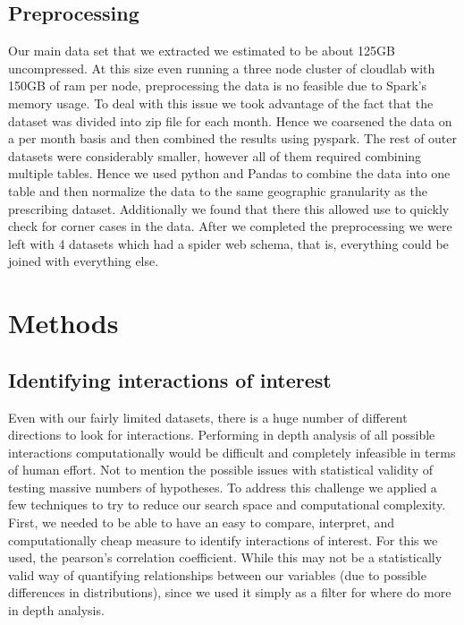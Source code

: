 \documentclass[a4paper]{article}
\begin{document}

	\subsection{Preprocessing}
		Our main data set that we extracted we estimated to be about 125GB uncompressed. At this size
		even running a three node cluster of cloudlab with 150GB of ram per node, preprocessing the 
		data is no feasible due to Spark's memory usage. To deal with this issue we took advantage 
		of the fact that the dataset was divided into zip file for each month. Hence we coarsened the
		data on a per month basis and then combined the results using pyspark. The rest of outer datasets
		were considerably smaller, however all of them required combining multiple tables. Hence 
		we used python and Pandas to combine the data into one table and then normalize the data to the same geographic 
		granularity as the prescribing dataset. Additionally we found that there this allowed use to quickly check for 
		corner cases in the data. After we completed the preprocessing we were left with 4 datasets which had a 
		spider web schema, that is, everything could be joined with everything else. %



\section{Methods}
	
	\subsection{Identifying interactions of interest}


		Even with our fairly limited datasets, there is a huge number of different directions to 
		look for interactions. Performing in depth analysis of all possible interactions computationally 
		would be difficult and completely infeasible in terms of human effort. Not to mention the possible 
		issues with statistical validity of testing massive numbers of hypotheses. To address this challenge
		we applied a few techniques to try to reduce our search space and computational complexity. First,
		we needed to be able to have an easy to compare, interpret, and computationally cheap measure
		to identify interactions of interest. For this we used, the pearson's correlation coefficient. While
		this may not be a statistically valid way of quantifying relationships between our variables (due to 
		possible differences in distributions), since we used it simply as a filter for where do more in depth
		analysis. 
\end{document}
